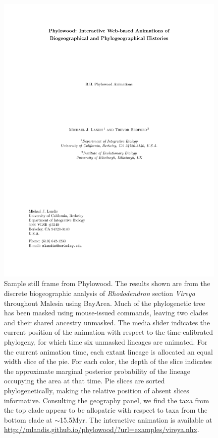 \documentclass[11pt]{article}
\begin{document}
\begin{figure}
\begin{center}
\includegraphics[width=\textwidth]{phylowood}
\caption{
Sample still frame from Phylowood. The results shown are from the discrete biogeographic analysis of {\it Rhododendron} section {\it Vireya} throughout Malesia using BayArea. Much of the phylogenetic tree has been masked using mouse-issued commands, leaving two clades and their shared ancestry unmasked. The media slider indicates the current position of the animation with respect to the time-calibrated phylogeny, for which time six unmasked lineages are animated.  For the current animation time, each extant lineage is allocated an equal width slice of the pie. For each color, the depth of the slice indicates the approximate marginal posterior probability of the lineage occupying the area at that time. Pie slices are sorted phylogenetically, making the relative position of absent slices informative. Consulting the geography panel, we find the taxa from the top clade appear to be allopatric with respect to taxa from the bottom clade at $\sim$15.5Myr. The interactive animation is available at \url{http://mlandis.github.io/phylowood/?url=examples/vireya.nhx}.
}
\label{phylowood}
\end{center}
\end{figure}
\end{document}
